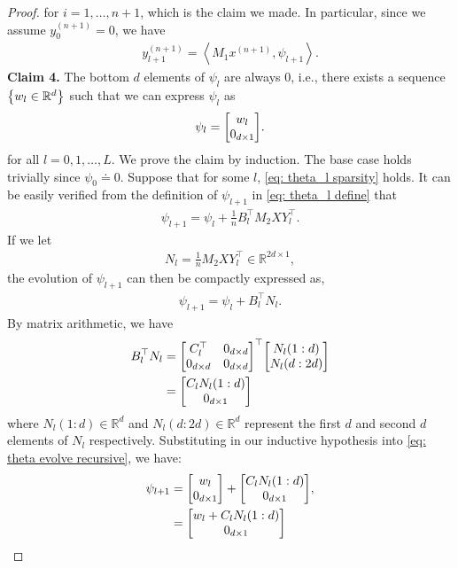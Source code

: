 \documentclass{article}
\newcommand{\R}{\mathbb{R}}
\newcommand{\indot}[2]{{\left<#1, #2\right>}}
\begin{document}
\begin{proof}
    for $i=1, \dots, n+1$, which is the claim we made.
    In particular, since we assume $y_0^{(n+1)} = 0$, we have
    \begin{align}
      y_{l+1}^{(n+1)} = \indot{M_1 x^{(n+1)}}{\psi_{l+1}}.
    \end{align}
    \textbf{Claim 4.} The bottom $d$ elements of $\psi_l$ are always 0, i.e., there exists a sequence $\qty{w_l \in \R^d}$ such that we can express $\psi_l$ as
    \begin{align}
        \psi_l = \mqty[w_l \\ 0_{d \times 1}]. \label{eq: theta_l sparsity}
    \end{align}
    for all $l = 0,1,\dots, L$.
    We prove the claim by induction. The base case holds trivially since $\psi_0 \doteq 0$. Suppose that for some $l$, \eqref{eq: theta_l sparsity} holds. It can be easily verified from the definition of $\psi_{l+1}$ in \eqref{eq: theta_l define} that
    \begin{align}
        \psi_{l+1} = \psi_{l} + \frac{1}{n} B_l^\top M_2 X Y_l^\top. \label{eq: theta evolve recursive}
    \end{align}
    If we let
    \begin{align}
        N_l = \frac{1}{n}M_2XY_l^{\top} \in \R^{2d \times 1},
    \end{align}
    the evolution of $\psi_{l+1}$ can then be compactly expressed as,
    \begin{align}
        \psi_{l+1} = \psi_l + B_l^\top N_l.
    \end{align}
    By matrix arithmetic, we have
    \begin{align}
          B_l^\top N_l &= \mqty[C_l^\top & 0_{d\times d} \\ 0_{d \times d} & 0_{d \times d}]^\top \mqty[N_l(1:d) \\ N_l(d:2d)] \\
          &= \mqty[C_l N_l(1:d) \\ 0_{d\times 1}]
    \end{align}
    where $N_l(1:d)\in \R^d$ and $N_l(d:2d)\in \R^d$ represent the first $d$ and second $d$ elements of $N_l$ respectively. Substituting in our inductive hypothesis into \eqref{eq: theta evolve recursive}, we have:
    \begin{align}
        \psi_{l+1} &=  \mqty[w_l \\ 0_{d\times 1}] + \mqty[C_l N_l(1:d) \\ 0_{d\times 1}], \\
        & = \mqty[w_l + C_l N_l(1:d) \\ 0_{d\times 1}]

\end{align}
\end{proof}
\end{document}
